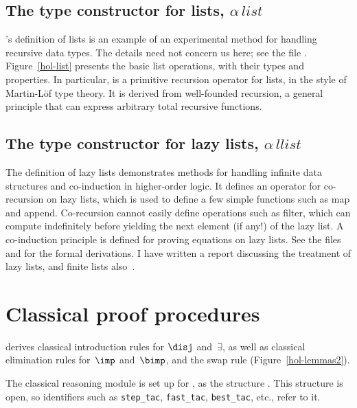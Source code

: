 \subsection{The type constructor for lists, $\alpha\,list$}
{\HOL}'s definition of lists is an example of an experimental method for
handling recursive data types.  The details need not concern us here; see
the file .  Figure~\ref{hol-list} presents the
basic list operations, with their types and properties.  In particular,
 is a primitive recursion operator for lists, in the
style of Martin-L\"of type theory.  It is derived from well-founded
recursion, a general principle that can express arbitrary total recursive
functions. 


\subsection{The type constructor for lazy lists, $\alpha\,llist$}
The definition of lazy lists demonstrates methods for handling infinite
data structures and co-induction in higher-order logic.  It defines an
operator for co-recursion on lazy lists, which is used to define a few
simple functions such as map and append.  Co-recursion cannot easily define
operations such as filter, which can compute indefinitely before yielding
the next element (if any!) of the lazy list.  A co-induction principle is
defined for proving equations on lazy lists.  See the files
 and  for the formal
derivations.  I have written a report discussing the treatment of lazy
lists, and finite lists also~\cite{paulson-coind}.


\section{Classical proof procedures} \label{hol-cla-prover}
{\HOL} derives classical introduction rules for $\disj$ and~$\exists$, as
well as classical elimination rules for~$\imp$ and~$\bimp$, and the swap
rule (Figure~\ref{hol-lemmas2}).

The classical reasoning module is set up for \HOL, as the structure 
.  This structure is open, so {\ML} identifiers such
as {\tt step_tac}, {\tt fast_tac}, {\tt best_tac}, etc., refer to it.

